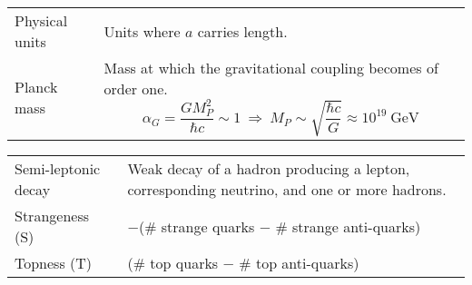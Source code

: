 \documentclass[12pt]{book}
\theoremstyle{definition}
\newenvironment{frontstuff}
  {\centering\chapter*{}}
  {\clearpage}
\begin{document}
\begin{frontstuff}
\begin{tabularx}{\linewidth}{lL}
Physical units& 
  Units where $a$ carries length. 
\vspace{2mm}\\
Planck mass&
  Mass at which the gravitational coupling becomes of order one.
  $$
    \alpha_G=\frac{GM_P^2}{\hbar c}\sim1~\Rightarrow~
     M_P\sim\sqrt{\frac{\hbar c}{G}}\approx10^{19}~\text{GeV}
  $$
\end{tabularx}
\clearpage
\begin{tabularx}{\linewidth}{lL}
Semi-leptonic decay& 
  Weak decay of a hadron producing a lepton, corresponding neutrino,
  and one or more hadrons. 
\vspace{2mm}\\
Strangeness (S)& 
  $-$(\# strange quarks $-$ \# strange anti-quarks)
\vspace{2mm}\\
Topness (T)& 
  (\# top quarks $-$ \# top anti-quarks)
\end{tabularx}
\clearpage


\end{frontstuff}
\end{document}
